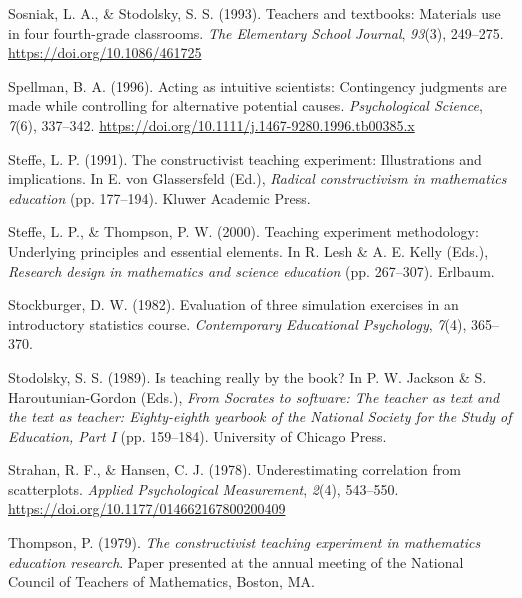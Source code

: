 \documentclass[11pt]{umnthesis}
\newlength{\cslhangindent}
\newenvironment{CSLReferences}[2] %
 {%
  \setlength{\parindent}{0pt}
  \ifodd #1 \everypar{\setlength{\hangindent}{\cslhangindent}}\ignorespaces\fi
  \ifnum #2 > 0
  \setlength{\parskip}{#2\baselineskip}
  \fi
 }%
 {}
\begin{document}
\begin{CSLReferences}{1}{0}
\leavevmode{}%
Sosniak, L. A., \& Stodolsky, S. S. (1993). Teachers and textbooks: Materials use in four fourth-grade classrooms. \emph{The Elementary School Journal}, \emph{93}(3), 249--275. \url{https://doi.org/10.1086/461725}

\leavevmode{}%
Spellman, B. A. (1996). Acting as intuitive scientists: Contingency judgments are made while controlling for alternative potential causes. \emph{Psychological Science}, \emph{7}(6), 337--342. \url{https://doi.org/10.1111/j.1467-9280.1996.tb00385.x}

\leavevmode{}%
Steffe, L. P. (1991). The constructivist teaching experiment: Illustrations and implications. In E. von Glassersfeld (Ed.), \emph{Radical constructivism in mathematics education} (pp. 177--194). Kluwer Academic Press.

\leavevmode{}%
Steffe, L. P., \& Thompson, P. W. (2000). Teaching experiment methodology: Underlying principles and essential elements. In R. Lesh \& A. E. Kelly (Eds.), \emph{Research design in mathematics and science education} (pp. 267--307). Erlbaum.

\leavevmode{}%
Stockburger, D. W. (1982). Evaluation of three simulation exercises in an introductory statistics course. \emph{Contemporary Educational Psychology}, \emph{7}(4), 365--370.

\leavevmode{}%
Stodolsky, S. S. (1989). Is teaching really by the book? In P. W. Jackson \& S. Haroutunian-Gordon (Eds.), \emph{{From Socrates to software: The teacher as text and the text as teacher: Eighty-eighth yearbook of the National Society for the Study of Education, Part I}} (pp. 159--184). University of Chicago Press.

\leavevmode{}%
Strahan, R. F., \& Hansen, C. J. (1978). Underestimating correlation from scatterplots. \emph{Applied Psychological Measurement}, \emph{2}(4), 543--550. \url{https://doi.org/10.1177/014662167800200409}

\leavevmode{}%
Thompson, P. (1979). \emph{The constructivist teaching experiment in mathematics education research}. {Paper presented at the annual meeting of the National Council of Teachers of Mathematics, Boston, MA}.


\end{CSLReferences}
\end{document}
